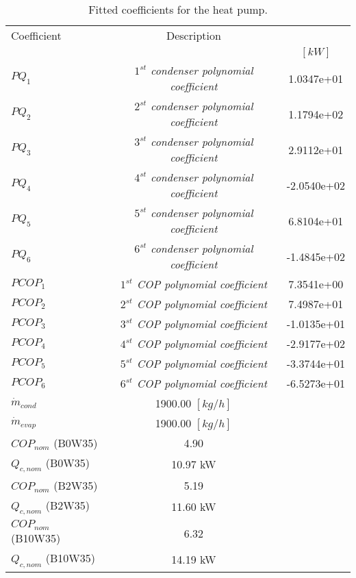 \documentclass[english]{SPFShortReport}
\author{Dani Carbonell}
\begin{document}
\begin{table}[!ht]
\begin{small}
\caption{Fitted coefficients for the heat pump.}
\begin{center}
\resizebox{12cm}{!} 
{
\begin{tabular}{l | c c } 
\hline
\hline
Coefficient &Description & \\ 
 & &$[kW]$\\ 
\hline
$PQ_{1}$ & \emph{$1^{st}$ condenser polynomial coefficient}  & 1.0347e+01    \\ 
$PQ_{2}$ & \emph{$2^{st}$ condenser polynomial coefficient}  & 1.1794e+02    \\ 
$PQ_{3}$ & \emph{$3^{st}$ condenser polynomial coefficient}  & 2.9112e+01    \\ 
$PQ_{4}$ & \emph{$4^{st}$ condenser polynomial coefficient}  & -2.0540e+02    \\ 
$PQ_{5}$ & \emph{$5^{st}$ condenser polynomial coefficient}  & 6.8104e+01    \\ 
$PQ_{6}$ & \emph{$6^{st}$ condenser polynomial coefficient}  & -1.4845e+02    \\ 
\hline
$PCOP_{1}$ & \emph{$1^{st}$ COP polynomial coefficient}  & 7.3541e+00    \\ 
$PCOP_{2}$ & \emph{$2^{st}$ COP polynomial coefficient}  & 7.4987e+01    \\ 
$PCOP_{3}$ & \emph{$3^{st}$ COP polynomial coefficient}  & -1.0135e+01    \\ 
$PCOP_{4}$ & \emph{$4^{st}$ COP polynomial coefficient}  & -2.9177e+02    \\ 
$PCOP_{5}$ & \emph{$5^{st}$ COP polynomial coefficient}  & -3.3744e+01    \\ 
$PCOP_{6}$ & \emph{$6^{st}$ COP polynomial coefficient}  & -6.5273e+01    \\ 
\hline
$\dot m_{cond}$ & 1900.00 $[kg/h]$\\ 
$\dot m_{evap}$ & 1900.00 $[kg/h]$\\ 
\hline
$COP_{nom}$ (B0W35)& 4.90 \\ 
$Q_{c,nom}$ (B0W35)& 10.97 kW\\ 
$COP_{nom}$ (B2W35)& 5.19 \\ 
$Q_{c,nom}$ (B2W35)& 11.60 kW\\ 
$COP_{nom}$ (B10W35)& 6.32 \\ 
$Q_{c,nom}$ (B10W35)& 14.19 kW\\ 
\hline
\hline
\end{tabular}
}
\label{CoefTable}
\end{center}
\end{small}
\end{table}
\end{document}

